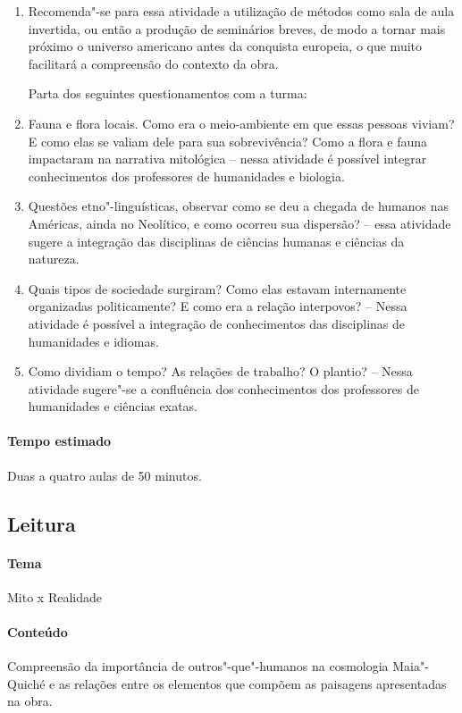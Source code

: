 \documentclass[12pt]{extarticle}
\begin{document}
\begin{enumerate}
\item 
Recomenda"-se para essa atividade a utilização de métodos como sala de
aula invertida, ou então a produção de seminários breves, de modo a
tornar mais próximo o universo americano antes da conquista europeia, o
que muito facilitará a compreensão do contexto da obra.

Parta dos seguintes questionamentos com a turma:

\item
Fauna e flora locais. Como era o meio-ambiente em que essas pessoas
viviam? E como elas se valiam dele para sua sobrevivência? Como a
flora e fauna impactaram na narrativa mitológica -- nessa atividade é
possível integrar conhecimentos dos professores de humanidades e biologia.

\item
Questões etno"-linguísticas, observar como se deu a chegada de humanos
nas Américas, ainda no Neolítico, e como ocorreu sua dispersão? --
essa atividade sugere a integração das disciplinas de ciências humanas 
e ciências da natureza.
\item
Quais tipos de sociedade surgiram? Como elas estavam internamente
organizadas politicamente? E como era a relação interpovos? -- Nessa
atividade é possível a integração de conhecimentos das disciplinas de 
humanidades e idiomas.

\item
Como dividiam o tempo? As relações de trabalho? O plantio? -- Nessa 
atividade sugere"-se a confluência dos conhecimentos dos professores de 
humanidades e ciências exatas.

\end{enumerate}

\paragraph{Tempo estimado} Duas a quatro aulas de 50 minutos. 

\subsection{Leitura} 

\paragraph{Tema} Mito x Realidade

\paragraph{Conteúdo} Compreensão da importância de outros"-que"-humanos na cosmologia
Maia"-Quiché e as relações entre os elementos que compõem as paisagens apresentadas na obra. 
\end{document}
